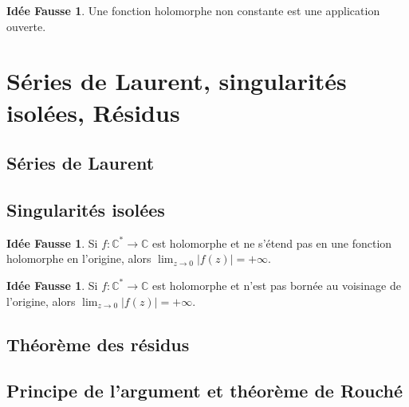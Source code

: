 \documentclass[11pt,a4paper]{article}
\newcommand{\C}{\mathbb{C}}
\theoremstyle{definition}
\newtheorem{ideeFausse}[theoreme]{Idée Fausse}
\theoremstyle{plain}
\begin{document}
\begin{ideeFausse}
Une fonction holomorphe non constante est une application ouverte.
\end{ideeFausse}

%






\section{Séries de Laurent, singularités isolées, Résidus}

\subsection{Séries de Laurent}
%
%
%


\subsection{Singularités isolées}

\begin{ideeFausse}
Si $f : \C^* \to \C$ est holomorphe et ne s'étend pas en une fonction holomorphe en l'origine, alors $\lim_{z\to 0} |f(z)| = +\infty$.
\end{ideeFausse}

\begin{ideeFausse}
Si $f : \C^* \to \C$ est holomorphe et n'est pas bornée au voisinage de l'origine, alors $\lim_{z\to 0} |f(z)| = +\infty$.
\end{ideeFausse}

%


\subsection{Théorème des résidus}

%
%



\subsection{Principe de l'argument et théorème de Rouché}
%
%
%
\end{document}
